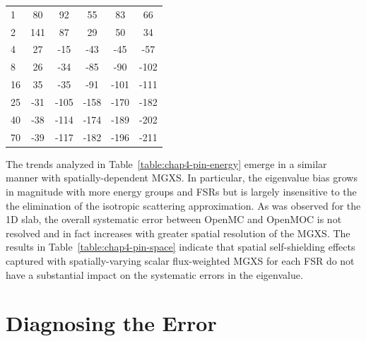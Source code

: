 \begin{table}[h!]
\begin{tabular}{a S[table-format=6.1] S[table-format=6.1] S[table-format=6.1] S[table-format=6.1] S[table-format=6.1]}
1 & 80 & 92 & 55 & 83 & 66 \\
2 & 141 & 87 & 29 & 50 & 34 \\
4 & 27 & -15 & -43 & -45 & -57 \\
8 & 26 & -34 & -85 & -90 & -102 \\
16 & 35 & -35 & -91 & -101 & -111 \\
25 & -31 & -105 & -158 & -170 & -182 \\
40 & -38 & -114 & -174 & -189 & -202 \\
70 & -39 & -117 & -182 & -196 & {} -211 \\
  \bottomrule
\end{tabular}
\end{table}

The trends analyzed in Table~\ref{table:chap4-pin-energy} emerge in a similar manner with spatially-dependent \ac{MGXS}. In particular, the eigenvalue bias grows in magnitude with more energy groups and \ac{FSR}s but is largely insensitive to the the elimination of the isotropic scattering approximation. As was observed for the 1D slab, the overall systematic error between OpenMC and OpenMOC is not resolved and in fact increases with greater spatial resolution of the \ac{MGXS}. The results in Table~\ref{table:chap4-pin-space} indicate that spatial self-shielding effects captured with spatially-varying scalar flux-weighted MGXS for each FSR do not have a substantial impact on the systematic errors in the eigenvalue.





\section{Diagnosing the Error}
\label{sec:chap4-diagnosis}

